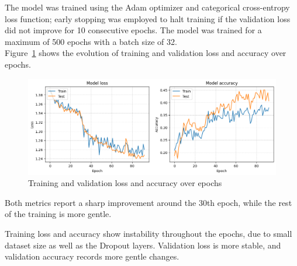 The model was trained using the Adam optimizer and categorical cross-entropy
loss function; early stopping was employed to halt training if the validation
loss did not improve for 10 consecutive epochs.
The model was trained for a maximum of 500 epochs with a batch size of 32.\\

Figure~\ref{fig:loss_acc} shows the evolution of training and validation loss
and accuracy over epochs.
\begin{figure}[H]
    \centering
    \includegraphics[width=1\textwidth]{plotsss/ts_loss_acc.png}
    \caption{Training and validation loss and accuracy over epochs}
    \label{fig:loss_acc}
\end{figure}

Both metrics report a sharp improvement around the 30th epoch,
while the rest of the training is more gentle.

Training loss and accuracy show instability throughout the epochs,
due to small dataset size as well as the Dropout layers.
Validation loss is more stable, and validation accuracy records more
gentle changes.



